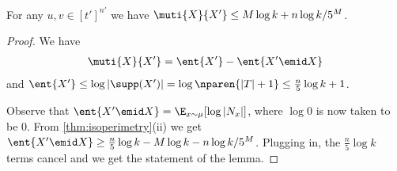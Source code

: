 \begin{lemma}
\label{lem:x-uniform} For any $u,v\in[t']^{n'}$ we have
$\muti{X}{X'}\le M\log k  + n\log k / 5^M$.
\end{lemma}
\begin{proof}
We have
\begin{align*}
\muti{X}{X'} = \ent{X'} - \ent{X'\emid X}
\end{align*}
and 
$\ent{X'}\le \log |\supp(X')|
    = \log \nparen{|T|+1}\le \frac{n}{5}\log k + 1$.

Observe that $\ent{X'\emid X} = \E_{x\sim
\mu}[\log|N_x|]$, where $\log 0$ is now taken to be $0$. From
\autoref{thm:isoperimetry}(ii) we get $\ent{X'\emid X}\geq
\frac{n}{5}\log k - M\log k - n\log k/5^M$.
Plugging in, the $\frac{n}{5}\log k$ terms cancel and we get
the statement of the lemma.
\end{proof}


